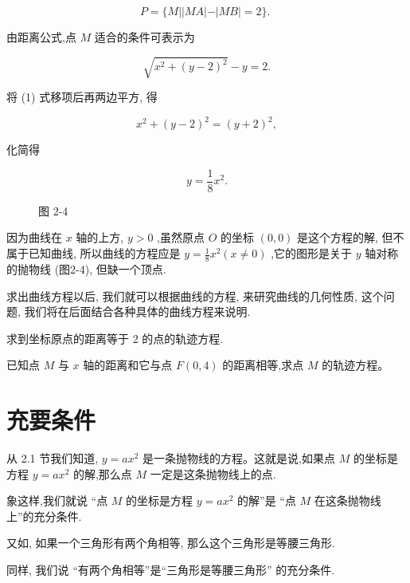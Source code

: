 \documentclass[lang=cn,newtx,12pt,scheme=chinese]{elegantbook}
\begin{document}
\[
  P = \{ M\left| \right| {MA}\left| -\right| {MB} \mid = 2\} \text{. }
\]

由距离公式,点 \(M\) 适合的条件可表示为

\[
  \sqrt{{x}^{2} + {\left( y - 2\right) }^{2}} - y = 2. \tag{1}
\]

将 (1) 式移项后再两边平方, 得

\[
    {x}^{2} + {\left( y - 2\right) }^{2} = {\left( y + 2\right) }^{2},
\]

化简得

\[
  y = \frac{1}{8}{x}^{2}.
\]

\begin{figure}[h]
	\centering
	
	\caption{图 2-4}
\end{figure}

因为曲线在 \(x\) 轴的上方, \(y > 0\) ,虽然原点 \(O\) 的坐标 \(\left( {0,0}\right)\) 是这个方程的解, 但不属于已知曲线, 所以曲线的方程应是 \(y = \frac{1}{8}{x}^{2}\left( {x \neq 0}\right)\) ,它的图形是关于 \(y\) 轴对称的抛物线 (图2-4), 但缺一个顶点.

求出曲线方程以后, 我们就可以根据曲线的方程, 来研究曲线的几何性质, 这个问题, 我们将在后面结合各种具体的曲线方程来说明.

\begin{problemset}[练习]

\item 求到坐标原点的距离等于 2 的点的轨迹方程.

\item 已知点 \(M\) 与 \(x\) 轴的距离和它与点 \(F\left( {0,4}\right)\) 的距离相等,求点 \(M\) 的轨迹方程。

\end{problemset}

\section{充要条件}

从 2.1 节我们知道, \(y = a{x}^{2}\) 是一条抛物线的方程。这就是说,如果点 \(M\) 的坐标是方程 \(y = a{x}^{2}\) 的解,那么点 \(M\) 一定是这条抛物线上的点.

象这样,我们就说 “点 \(M\) 的坐标是方程 \(y = a{x}^{2}\) 的解”是 “点 \(M\) 在这条抛物线上”的充分条件.

又如, 如果一个三角形有两个角相等, 那么这个三角形是等腰三角形.

同样, 我们说 “有两个角相等”是“三角形是等腰三角形” 的充分条件.
\end{document}
